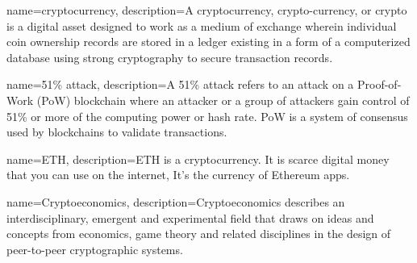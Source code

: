 \makeglossaries
 
{
    name=cryptocurrency,
    description={A cryptocurrency, crypto-currency, or crypto is a digital asset designed to work as a medium of exchange wherein individual coin ownership records are stored in a ledger existing in a form of a computerized database using strong cryptography to secure transaction records.}
}

{
    name=51\% attack,
    description={A 51\% attack refers to an attack on a Proof-of-Work (PoW) blockchain where an attacker or a group of attackers gain control of 51\% or more of the computing power or hash rate. PoW is a system of consensus used by blockchains to validate transactions.}
}

{
    name=ETH,
    description={ETH is a cryptocurrency. It is scarce digital money that you can use on the internet, It's the currency of Ethereum apps.}
}

{
    name=Cryptoeconomics,
    description={Cryptoeconomics describes an interdisciplinary, emergent and experimental field that draws on ideas and concepts from economics, game theory and related disciplines in the design of peer-to-peer cryptographic systems.}
}